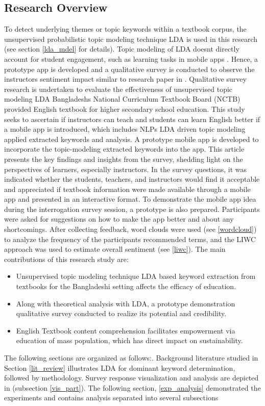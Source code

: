 \documentclass[sn-mathphys,Numbered]{sn-jnl}%
\theoremstyle{thmstyleone}%
\theoremstyle{thmstyletwo}%
\theoremstyle{thmstylethree}%
\begin{document}
\subsection{Research Overview} 
To detect underlying themes or topic keywords within a textbook corpus, the unsupervised probabilistic topic modeling technique LDA is used in this research \cite{jelodar_latent_2019} (see section \ref{lda_mdel} for details). Topic modeling of LDA doesn\textquotesingle t directly account for student engagement, such as learning tasks in mobile apps \cite{sandberg_mobile_2011}. Hence, a prototype app is developed and a qualitative survey is conducted to observe the instructor\textquotesingle s sentiment impact similar to research paper in \cite{oz2015investigation}. Qualitative survey research is undertaken to evaluate the effectiveness of unsupervised topic modeling LDA Bangladesh\textquotesingle s National Curriculum Textbook Board (NCTB) provided English textbook for higher secondary school education. This study seeks to ascertain if instructors can teach and students can learn English better if a mobile app is introduced, which includes NLP\textquotesingle s LDA driven topic modeling applied extracted keywords and analysis. A prototype mobile app is developed to incorporate the topic-modeling extracted keywords into the app. This article presents the key findings and insights from the survey, shedding light on the perspectives of learners, especially instructors. In the survey questions, it was indicated whether the students, teachers, and instructors would find it acceptable and appreciated if textbook information were made available through a mobile app and presented in an interactive format. To demonstrate the mobile app idea during the interrogation survey session, a prototype is also prepared. Participants were asked for suggestions on how to make the app better and about any shortcomings. After collecting feedback, word clouds were used (see \ref{wordcloud}) to analyze the frequency of the participants\textquotesingle{} recommended terms, and the LIWC approach was used to estimate overall sentiment (see \ref{liwc}). The main contributions of this research study are: \begin{itemize} \item Unsupervised topic modeling technique LDA based keyword extraction from textbooks for the Bangladeshi setting affects the efficacy of education. \item Along with theoretical analysis with LDA, a prototype demonstration qualitative survey conducted to realize its potential and credibility. \item English Textbook content comprehension facilitates empowerment via education of mass population, which has direct impact on sustainability. \end{itemize} \hfill The following sections are organized as follows:. Background literature studied in Section \ref{lit_review} illustrates LDA for dominant keyword determination, followed by methodology. Survey response visualization and analysis are depicted in (subsection \ref{vis_part}). The following section, \ref{exp_analysis} demonstrated the experiments and contains analysis separated into several subsections 
\end{document}

